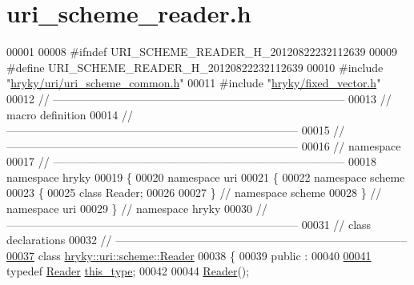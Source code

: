 \hypertarget{uri__scheme__reader_8h_source}{\section{uri\-\_\-scheme\-\_\-reader.\-h}
}

\begin{DoxyCode}
00001 
00008 \textcolor{preprocessor}{#ifndef URI\_SCHEME\_READER\_H\_20120822232112639}
00009 \textcolor{preprocessor}{}\textcolor{preprocessor}{#define URI\_SCHEME\_READER\_H\_20120822232112639}
00010 \textcolor{preprocessor}{}\textcolor{preprocessor}{#include "\hyperlink{uri__scheme__common_8h}{hryky/uri/uri_scheme_common.h}"}
00011 \textcolor{preprocessor}{#include "\hyperlink{fixed__vector_8h}{hryky/fixed_vector.h}"}
00012 \textcolor{comment}{//
      ------------------------------------------------------------------------------}
00013 \textcolor{comment}{// macro definition}
00014 \textcolor{comment}{//
      ------------------------------------------------------------------------------}
00015 \textcolor{comment}{//
      ------------------------------------------------------------------------------}
00016 \textcolor{comment}{// namespace}
00017 \textcolor{comment}{//
      ------------------------------------------------------------------------------}
00018 \textcolor{keyword}{namespace }hryky
00019 \{
00020 \textcolor{keyword}{namespace }uri
00021 \{
00022 \textcolor{keyword}{namespace }scheme
00023 \{
00025     \textcolor{keyword}{class }Reader;
00026 
00027 \} \textcolor{comment}{// namespace scheme}
00028 \} \textcolor{comment}{// namespace uri}
00029 \} \textcolor{comment}{// namespace hryky}
00030 \textcolor{comment}{//
      ------------------------------------------------------------------------------}
00031 \textcolor{comment}{// class declarations}
00032 \textcolor{comment}{//
      ------------------------------------------------------------------------------}
\hypertarget{uri__scheme__reader_8h_source_l00037}{}\hyperlink{classhryky_1_1uri_1_1scheme_1_1_reader}{00037} \textcolor{comment}{}\textcolor{keyword}{class }\hyperlink{classhryky_1_1uri_1_1scheme_1_1_reader}{hryky::uri::scheme::Reader}
00038 \{
00039 \textcolor{keyword}{public} :
00040 
\hypertarget{uri__scheme__reader_8h_source_l00041}{}\hyperlink{classhryky_1_1uri_1_1scheme_1_1_reader_a06f7352c04d11e56624f3fe26280411f}{00041}     \textcolor{keyword}{typedef} \hyperlink{classhryky_1_1uri_1_1scheme_1_1_reader}{Reader} \hyperlink{classhryky_1_1uri_1_1scheme_1_1_reader_a06f7352c04d11e56624f3fe26280411f}{this_type};
00042 
00044     \hyperlink{classhryky_1_1uri_1_1scheme_1_1_reader_a46cc9166731a0ae7bbcb5fc388cd0815}{Reader}();

\end{DoxyCode}
